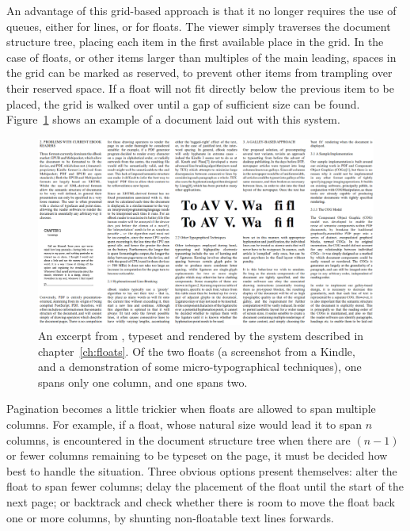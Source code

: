 An advantage of this grid-based approach is that it no longer requires the use of queues, either for lines, or for floats. The viewer simply traverses the document structure tree, placing each item in the first available place in the grid. In the case of floats, or other items larger than multiples of the main \gls{leading}, spaces in the grid can be marked as reserved, to prevent other items from trampling over their reserved space. If a float will not fit directly below the previous item to be placed, the grid is walked over until a gap of sufficient size can be found. Figure~\ref{fig:screengrab} shows an example of a document laid out with this system.



\begin{figure}
    \includegraphics[angle=90,origin=c,width=\textwidth]{gfx/floatrendering}
    \caption[A sample rendering with multi-column floats]{An excerpt from \cite{Pinkney2011}, typeset and rendered by the system described in chapter~\ref{ch:floats}. Of the two floats (a screenshot from a Kindle, and a demonstration of some micro-typographical techniques), one spans only one column, and one spans two. }
    \label{fig:screengrab}
\end{figure}

Pagination becomes a little trickier when floats are allowed to span multiple columns. For example, if a float, whose natural size would lead it to span $n$ columns, is encountered in the document structure tree when there are $(n-1)$ or fewer columns remaining to be typeset on the page, it must be decided how best to handle the situation. Three obvious options present themselves: alter the float to span fewer columns; delay the placement of the float until the start of the next page; or backtrack and check whether there is room to move the float back one or more columns, by shunting non-floatable text lines forwards.

